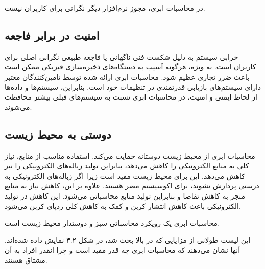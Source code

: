 \documentclass{book}
\begin{document}
    \begin{addinfo}

        در محاسبات ابری، مجوز نرم‌افزار دیگر نگرانی برای کاربران نیست.

    \end{addinfo}

    \subsection{امنیت در برابر فاجعه}

        خرابی سیستم به دلیل شکست فنی ناگهانی یا فاجعه طبیعی نگرانی اصلی برای کاربران است. به ویژه، هرگونه آسیب به دستگاه‌های ذخیره‌سازی فیزیکی ممکن است باعث ضرر تجاری عظیم شود. محاسبات ابری ارائه شده توسط تامین‌کنندگان معتبر دارای سیستم‌های بازیابی قدرتمندی در تنظیمات خود است. بنابراین، سیستم‌ها و داده‌ها از لحاظ ایمنی و امنیت، در محاسبات ابری نسبت به سیستم‌های قبلی بیشتر محافظت می‌شوند.

    \subsection{دوستی به محیط زیست}

        محاسبات ابری از محیط زیست دوستانه حمایت می‌کند. استفاده مناسب از منابع، نیاز کلی به منابع الکترونیکی را کاهش می‌دهد، بنابراین تولید زباله‌های الکترونیکی را نیز کاهش می‌دهد. این برای محیط زیست مفید است زیرا اگر زباله‌های الکترونیکی به درستی پردازش نشوند، برای اکوسیستم مضر هستند. علاوه بر این، کاهش نیاز به منابع منجر به کاهش تقاضا و بنابراین تولید منابع محاسباتی می‌شود. این کاهش در تولید الکترونیکی باعث کاهش انتشار کربن و کمک به کاهش کلی ردپای کربن می‌شود.

    \begin{addinfo}
        
        محاسبات ابری یک رویکرد محاسباتی سبز و دوستدار محیط زیست است.

    \end{addinfo}

        این لیست طولانی از مزایایی که در بالا بحث شد، در شکل ۳.۲ نمایش داده شده‌اند. آنها نشان می‌دهند که محاسبات ابری چه قدر مفید است و چرا انقدر افراد به آن مشتاق هستند.
\end{document}
